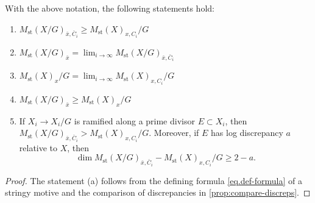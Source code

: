 \documentclass[12pt]{amsart}
\theoremstyle{plain}   %
\theoremstyle{definition}    %
\theoremstyle{remark}    %
\numberwithin{equation}{theorem}
\DeclareMathOperator{\st}{\mathrm{st}}
\begin{document}
\begin{lemma}\label{lem.five-assertions}
With the above notation, the following statements hold:
\begin{enumerate}
    \item $M_{\st}(X/G)_{\bar{x},\bar{C}_i} \geq M_{\st}(X)_{x,C_i}/G$
    \item $M_{\st}(X/G)_{\bar{x}} = \lim_{i \rightarrow \infty} M_{\st}(X/G)_{\bar{x},\bar{C}_i}$
    \item $M_{\st}(X)_{x}/G = \lim_{i \rightarrow \infty} M_{\st}(X)_{x,C_i}/G$
    \item $M_{\st}(X/G)_{\bar{x}} \geq M_{\st}(X)_{x}/G$
    \item If $X_i \to X_i/G$ is ramified along a prime divisor $E\subset X_i$, then $M_{\st}(X/G)_{\bar{x},\bar{C}_i} > M_{\st}(X)_{x,C_i}/G$. Moreover, if $E$ has log discrepancy $a$ relative to $X$, then
    \[
    \dim M_{\st}(X/G)_{\bar{x},\bar{C}_i} - M_{\st}(X)_{x,C_i}/G \ge 2-a.
    \]
\end{enumerate}
\begin{proof}
The statement (a) follows from the defining formula \autoref{eq.def-formula} of a stringy motive and the comparison of discrepancies in \autoref{prop:compare-discreps}.


\end{proof}
\end{lemma}
\end{document}
